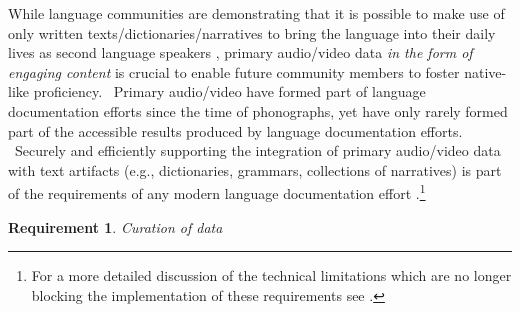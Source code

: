 \documentclass[11pt]{article}
\newcommand{\smalltodo}[2][]
    {\todo[caption={#2}, #1]
    {\tiny#2\normalsize}}
\newtheorem{requirement}{Requirement}
\begin{document}
While language communities are demonstrating that it is possible to make use of
only written texts/dictionaries/narratives \cite{Costa:2012} to bring the language into their
daily lives as second language speakers  \cite{Leonard:2012}, primary audio/video data \emph{in the
form of engaging content} is crucial to enable future community members to
foster native-like proficiency.%
~Primary audio/video  have formed part of  language documentation efforts since
the time of phonographs, yet have only rarely formed part of the accessible
results produced by language documentation efforts. %
~Securely and efficiently supporting the integration of primary audio/video data
with text artifacts (e.g., dictionaries, grammars, collections of narratives)
is part of the requirements of any modern language documentation effort
\cite{Schroeter:2006} \cite{Good:2012b}.\footnote{For a more detailed discussion of the technical limitations which are no longer blocking the implementation of these requirements see \cite{lingsync:2012}. } 
 




\begin{requirement}
	\label{req:curation}
       Curation of data
\end{requirement}
\end{document}
